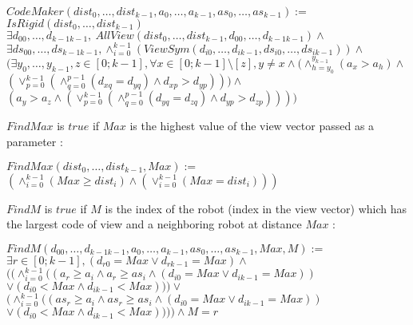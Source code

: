\documentclass{article}
\begin{document}
\begin{center}

$CodeMaker(dist_{0}, \ldots ,dist_{k-1}, a_{0}, \ldots , a_{k-1}, as_{0}, \ldots , as_{k-1}):=$\\
$IsRigid(dist_{0}, \ldots ,dist_{k-1})$\\
$\exists d_{00}, \ldots ,d_{k-1k-1},\ AllView(dist_{0}, \ldots ,dist_{k-1}, d_{00}, \ldots ,d_{k-1k-1})\land$\\
$\exists ds_{00}, \ldots ,ds_{k-1k-1}, \land_{i=0}^{k-1} (ViewSym(d_{i0}, \ldots , d_{ik-1}, ds_{i0}, \ldots , ds_{ik-1}))\land$\\
$(\exists y_{0}, \ldots , y_{k-1},z \in [0;k-1], \forall x \in [0;k-1] \setminus [z], y\not=x \land
(\land_{h=y_{0}}^{y_{k-1}}(a_{x} > a_{h}) \land $\\
$(\lor_{p=0}^{k-1}(\land_{q=0}^{p-1}(d_{xq} = d_{yq}) \land d_{xp} > d_{yp} ) ) )\land $\\
$(a_{y} > a_{z} \land (\lor_{p=0}^{k-1}(\land_{q=0}^{p-1}(d_{yq} = d_{zq}) \land d_{yp} > d_{zp} ) ))
)$\\
\end{center}

$FindMax$ is $true$ if $Max$ is the highest value of the view vector passed as a parameter :

\begin{center}

$FindMax(dist_{0}, \ldots ,dist_{k-1}, Max):=$\\
$(\land_{i=0}^{k-1} (Max \geq dist_{i}) \land (\lor_{i=0}^{k-1} (Max = dist_{i})))$
\end{center}

$FindM$ is $true$ if $M$ is the index of the robot (index in the view vector) which has the largest code of view and a neighboring robot at distance $Max$ :

\begin{center}

$FindM(d_{00}, \ldots ,d_{k-1k-1}, a_{0}, \ldots , a_{k-1}, as_{0}, \ldots , as_{k-1}, Max, M):=$\\
$\exists r \in [0; k-1], (d_{r0} = Max \lor d_{rk-1} = Max) \land $\\
$((\land_{i=0}^{k-1} ((a_{r} \geq a_i \land a_{r} \geq as_i \land (d_{i0} = Max \lor d_{ik-1} = Max))$\\
$\lor (d_{i0} < Max \land d_{ik-1} < Max))) \lor$\\
$(\land_{i=0}^{k-1} ((as_{r} \geq a_i \land as_{r} \geq as_i \land (d_{i0} = Max \lor d_{ik-1} = Max))$\\
$\lor (d_{i0} < Max \land d_{ik-1} < Max)))) \land M = r $
\end{center}
\end{document}
